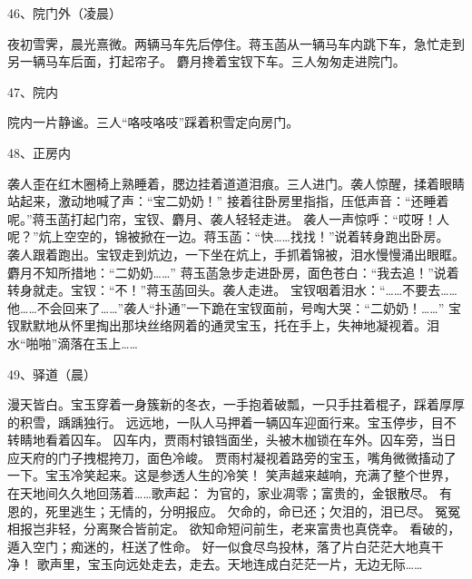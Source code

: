 46、院门外（凌晨）\par
夜初雪霁，晨光熹微。两辆马车先后停住。蒋玉菡从一辆马车内跳下车，急忙走到另一辆马车后面，打起帘子。
麝月搀着宝钗下车。三人匆匆走进院门。

47、院内\par
院内一片静谧。三人“咯吱咯吱”踩着积雪定向房门。

48、正房内\par
袭人歪在红木圈椅上熟睡着，腮边挂着道道泪痕。三人进门。袭人惊醒，揉着眼睛站起来，激动地喊了声：“宝二奶奶！”
接着往卧房里指指，压低声音：“还睡着呢。”蒋玉菡打起门帘，宝钗、麝月、袭人轻轻走进。
袭人一声惊呼：“哎呀！人呢？”炕上空空的，锦被掀在一边。蒋玉菡：“快……找找！”说着转身跑出卧房。
袭人跟着跑出。宝钗走到炕边，一下坐在炕上，手抓着锦被，泪水慢慢涌出眼眶。麝月不知所措地：“二奶奶……”
蒋玉菡急步走进卧房，面色苍白：“我去追！”说着转身就走。宝钗：“不！”蒋玉菡回头。袭人走进。
宝钗咽着泪水：“……不要去……他……不会回来了……”袭人“扑通”一下跪在宝钗面前，号啕大哭：“二奶奶！……”
宝钗默默地从怀里掏出那块丝络网着的通灵宝玉，托在手上，失神地凝视着。泪水“啪啪”滴落在玉上……

49、驿道（晨）\par
漫天皆白。宝玉穿着一身簇新的冬衣，一手抱着破瓢，一只手拄着棍子，踩着厚厚的积雪，踽踽独行。
远远地，一队人马押着一辆囚车迎面行来。宝玉停步，目不转睛地看着囚车。
囚车内，贾雨村锒铛面坐，头被木枷锁在车外。囚车旁，当日应天府的门子拽棍挎刀，面色冷峻。
贾雨村凝视着路旁的宝玉，嘴角微微搐动了一下。宝玉冷笑起来。这是参透人生的冷笑！
笑声越来越响，充满了整个世界，在天地间久久地回荡着……歌声起：
为官的，家业凋零；富贵的，金银散尽。
有恩的，死里逃生；无情的，分明报应。
欠命的，命已还；欠泪的，泪已尽。
冤冤相报岂非轻，分离聚合皆前定。
欲知命短问前生，老来富贵也真侥幸。
看破的，遁入空门；痴迷的，枉送了性命。
好一似食尽鸟投林，落了片白茫茫大地真干净！
歌声里，宝玉向远处走去，走去。天地连成白茫茫一片，无边无际……